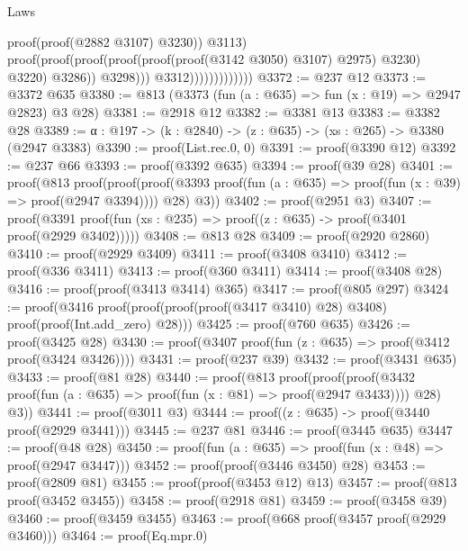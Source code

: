 \begin{lexlean}{Laws}
\begin{coremodule}
                                                        proof(proof(@2882 @3107) @3230))
                                                      @3113)
                                                    proof(proof(proof(proof(proof(proof(@3142 @3050)
                                                                @3107)
                                                              @2975)
                                                            @3230)
                                                          @3220)
                                                        @3286))
                                                  @3298)))
                                        @3312)))))))))))))
@3372 := @237 @12
@3373 := @3372 @635
@3380 := @813 (@3373 (fun (a : @635) => fun (x : @19) => @2947 @2823) @3 @28)
@3381 := @2918 @12
@3382 := @3381 @13
@3383 := @3382 @28
@3389 := {α : @197} -> (k : @2840) -> (z : @635) -> (xs : @265) -> @3380 (@2947 @3383)
@3390 := proof(List.rec.{0, 0})
@3391 := proof(@3390 @12)
@3392 := @237 @66
@3393 := proof(@3392 @635)
@3394 := proof(@39 @28)
@3401 := proof(@813
      proof(proof(proof(@3393 proof(fun (a : @635) => proof(fun (x : @39) => proof(@2947 @3394))))
            @28)
          @3))
@3402 := proof(@2951 @3)
@3407 := proof(@3391 proof(fun (xs : @235) => proof((z : @635) -> proof(@3401 proof(@2929 @3402)))))
@3408 := @813 @28
@3409 := proof(@2920 @2860)
@3410 := proof(@2929 @3409)
@3411 := proof(@3408 @3410)
@3412 := proof(@336 @3411)
@3413 := proof(@360 @3411)
@3414 := proof(@3408 @28)
@3416 := proof(proof(@3413 @3414) @365)
@3417 := proof(@805 @297)
@3424 := proof(@3416
      proof(proof(proof(proof(@3417 @3410) @28) @3408) proof(proof(Int.add_zero) @28)))
@3425 := proof(@760 @635)
@3426 := proof(@3425 @28)
@3430 := proof(@3407 proof(fun (z : @635) => proof(@3412 proof(@3424 @3426))))
@3431 := proof(@237 @39)
@3432 := proof(@3431 @635)
@3433 := proof(@81 @28)
@3440 := proof(@813
      proof(proof(proof(@3432 proof(fun (a : @635) => proof(fun (x : @81) => proof(@2947 @3433))))
            @28)
          @3))
@3441 := proof(@3011 @3)
@3444 := proof((z : @635) -> proof(@3440 proof(@2929 @3441)))
@3445 := @237 @81
@3446 := proof(@3445 @635)
@3447 := proof(@48 @28)
@3450 := proof(fun (a : @635) => proof(fun (x : @48) => proof(@2947 @3447)))
@3452 := proof(proof(@3446 @3450) @28)
@3453 := proof(@2809 @81)
@3455 := proof(proof(@3453 @12) @13)
@3457 := proof(@813 proof(@3452 @3455))
@3458 := proof(@2918 @81)
@3459 := proof(@3458 @39)
@3460 := proof(@3459 @3455)
@3463 := proof(@668 proof(@3457 proof(@2929 @3460)))
@3464 := proof(Eq.mpr.{0})

\end{coremodule}
\end{lexlean}
